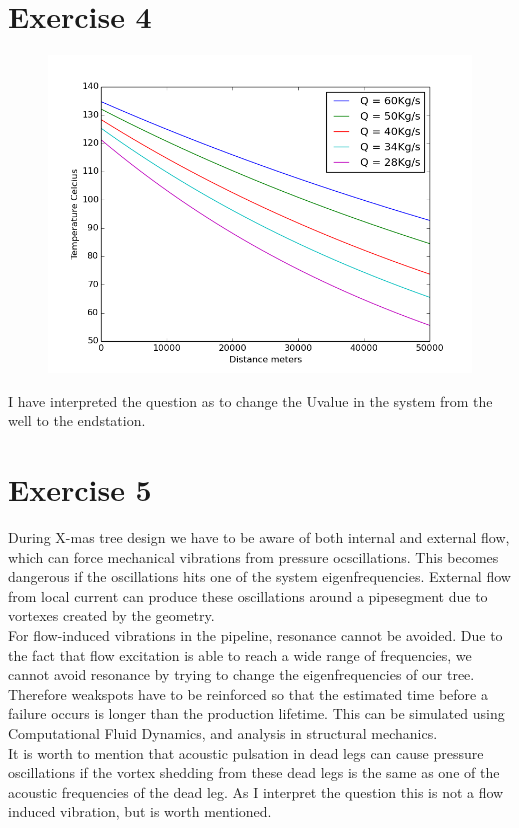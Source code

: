 \documentclass[a4paper,norsk]{article}
\begin{document}
\section*{Exercise 4}
\begin{figure}[h!]  
  \centering
  \includegraphics[scale=0.4]{TASK4shore.png}
\end{figure}
I have interpreted the question as to change the Uvalue in the system from the well to the endstation.

\newpage
\section*{Exercise 5}
During X-mas tree design we have to be aware of both internal and external flow, which can force mechanical vibrations from pressure ocscillations. This becomes dangerous if the oscillations hits one of the system eigenfrequencies. External flow from local current can produce these oscillations around a pipesegment due to vortexes created by the geometry. \\
For flow-induced vibrations in the pipeline, resonance cannot be avoided. Due to the fact that flow excitation is able to reach a wide range of frequencies, we cannot avoid resonance by trying to change the eigenfrequencies of our tree. Therefore weakspots have to be reinforced so that the estimated time before a failure occurs is longer than the production lifetime. This can be simulated using Computational Fluid Dynamics, and analysis in structural mechanics. \\
It is worth to mention that acoustic pulsation in dead legs can cause pressure oscillations if the vortex shedding from these dead legs is the same as one of the acoustic frequencies of the dead leg. As I interpret the question this is not a flow induced vibration, but is worth mentioned.
\end{document}
